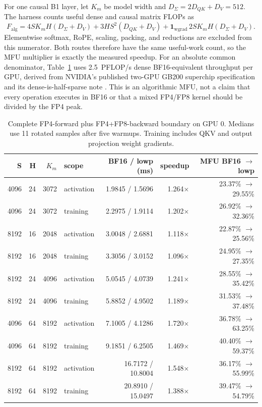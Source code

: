 For one causal B1 layer, let $K_m$ be model width and
$D_\Sigma=2D_{QK}+D_V=512$.  The harness counts useful dense and causal
matrix FLOPs as
\begin{equation}
  F_{\mathrm{alg}}=
  4SK_mH(D_\Sigma+D_V)
  +3HS^2(D_{QK}+D_V)
  +\mathbf 1_{\mathrm{wgrad}}\,2SK_mH(D_\Sigma+D_V).
  \label{eq:e2e-algorithmic-flops}
\end{equation}
Elementwise softmax, RoPE, scaling, packing, and reductions are excluded from
this numerator.  Both routes therefore have the same useful-work count, so
the MFU multiplier is exactly the measured speedup.  For an absolute common
denominator, Table~\ref{tab:e2e-mfu} uses 2.5~PFLOP/s dense BF16-equivalent
throughput per GPU, derived from NVIDIA's published two-GPU GB200 superchip
specification and its dense-is-half-sparse note \cite{nvidia2026gb200}.  This
is an algorithmic MFU, not a claim that every operation executes in BF16 or
that a mixed FP4/FP8 kernel should be divided by the FP4 peak.

\begin{table}[htbp]
\centering
\caption{Complete FP4-forward plus FP4+FP8-backward boundary on GPU 0.
Medians use 11 rotated samples after five warmups.  Training includes QKV and
output projection weight gradients.}
\label{tab:e2e-mfu}
\scriptsize
\begin{tabular}{rrr l rrr}
\toprule
S & H & $K_m$ & scope & BF16 / lowp (ms) & speedup & MFU BF16 $\to$ lowp \\
\midrule
4096 & 24 & 3072 & activation & 1.9845 / 1.5696 & 1.264$\times$ & 23.37\% $\to$ 29.55\% \\
4096 & 24 & 3072 & training   & 2.2975 / 1.9114 & 1.202$\times$ & 26.92\% $\to$ 32.36\% \\
8192 & 16 & 2048 & activation & 3.0048 / 2.6881 & 1.118$\times$ & 22.87\% $\to$ 25.56\% \\
8192 & 16 & 2048 & training   & 3.3056 / 3.0152 & 1.096$\times$ & 24.95\% $\to$ 27.35\% \\
8192 & 24 & 4096 & activation & 5.0545 / 4.0739 & 1.241$\times$ & 28.55\% $\to$ 35.42\% \\
8192 & 24 & 4096 & training   & 5.8852 / 4.9502 & 1.189$\times$ & 31.53\% $\to$ 37.48\% \\
4096 & 64 & 8192 & activation & 7.1005 / 4.1286 & 1.720$\times$ & 36.78\% $\to$ 63.25\% \\
4096 & 64 & 8192 & training   & 9.1851 / 6.2505 & 1.469$\times$ & 40.40\% $\to$ 59.37\% \\
8192 & 64 & 8192 & activation & 16.7172 / 10.8004 & 1.548$\times$ & 36.17\% $\to$ 55.99\% \\
8192 & 64 & 8192 & training   & 20.8910 / 15.0497 & 1.388$\times$ & 39.47\% $\to$ 54.79\% \\
\bottomrule
\end{tabular}
\end{table}

